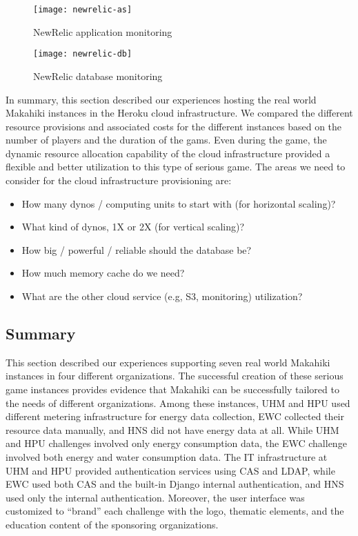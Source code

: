 \begin{figure}[ht!]
  \center
  \texttt{[image: newrelic-as]}
  \caption{NewRelic application monitoring}
  \label{fig:newrelic-as}
\end{figure}

\begin{figure}[ht!]
  \center
  \texttt{[image: newrelic-db]}
  \caption{NewRelic database monitoring}
  \label{fig:newrelic-db}
\end{figure}

In summary, this section described our experiences hosting the real world Makahiki instances in the Heroku cloud infrastructure. We compared the different resource provisions and associated costs for the different instances based on the number of players and the duration of the gams. Even during the game, the dynamic resource allocation capability of the cloud infrastructure provided a flexible and better utilization to this type of serious game. The areas we need to consider for the cloud infrastructure provisioning are:
\begin{itemize}
\item How many dynos / computing units to start with (for horizontal scaling)?
\item What kind of dynos, 1X or 2X (for vertical scaling)? 
\item How big / powerful / reliable should the database be? 
\item How much memory cache do we need?
\item What are the other cloud service (e.g, S3, monitoring) utilization?
\end{itemize}

\subsection{Summary}

This section described our experiences supporting seven real world Makahiki instances in four different organizations. The successful creation of these serious game instances provides evidence that Makahiki can be successfully tailored to the needs of different organizations. Among these instances, UHM and HPU used different metering infrastructure for energy data collection, EWC collected their resource data manually, and HNS did not have energy data at all. While UHM and HPU challenges involved only energy consumption data, the EWC challenge involved both energy and water consumption data. The IT infrastructure at UHM and HPU provided authentication services using CAS and LDAP, while EWC used both CAS and the built-in Django internal  authentication, and HNS used only the internal authentication. Moreover, the user interface was customized to ``brand'' each challenge with the logo, thematic elements, and the education content of the sponsoring organizations.

